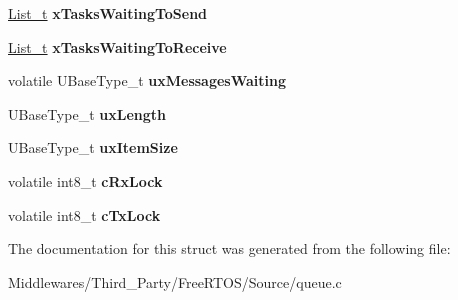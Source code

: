 \begin{DoxyCompactItemize}
\begin{tabbing}
\end{tabbing}\item 
\mbox{\label{struct_queue_definition_a5cfd8ae6db5da134ed16405043a0d898}} 
\mbox{\hyperlink{structx_l_i_s_t}{List\+\_\+t}} {\bfseries x\+Tasks\+Waiting\+To\+Send}
\item 
\mbox{\label{struct_queue_definition_a8ad185d9d83713c774e6a897580d8313}} 
\mbox{\hyperlink{structx_l_i_s_t}{List\+\_\+t}} {\bfseries x\+Tasks\+Waiting\+To\+Receive}
\item 
\mbox{\label{struct_queue_definition_afb61b3f2247402ed3b8b159311c408b7}} 
volatile U\+Base\+Type\+\_\+t {\bfseries ux\+Messages\+Waiting}
\item 
\mbox{\label{struct_queue_definition_a619169da78e43281a73fbdf13f9eddfb}} 
U\+Base\+Type\+\_\+t {\bfseries ux\+Length}
\item 
\mbox{\label{struct_queue_definition_a216cc99516d7f82573f6cb19f5a9f626}} 
U\+Base\+Type\+\_\+t {\bfseries ux\+Item\+Size}
\item 
\mbox{\label{struct_queue_definition_a2017e9e2e81e1fd301fa88236614653e}} 
volatile int8\+\_\+t {\bfseries c\+Rx\+Lock}
\item 
\mbox{\label{struct_queue_definition_a77c52e94671f477fd2942db97e20838b}} 
volatile int8\+\_\+t {\bfseries c\+Tx\+Lock}
\end{DoxyCompactItemize}


The documentation for this struct was generated from the following file\+:\begin{DoxyCompactItemize}
\item 
Middlewares/\+Third\+\_\+\+Party/\+Free\+R\+T\+O\+S/\+Source/queue.\+c\end{DoxyCompactItemize}
